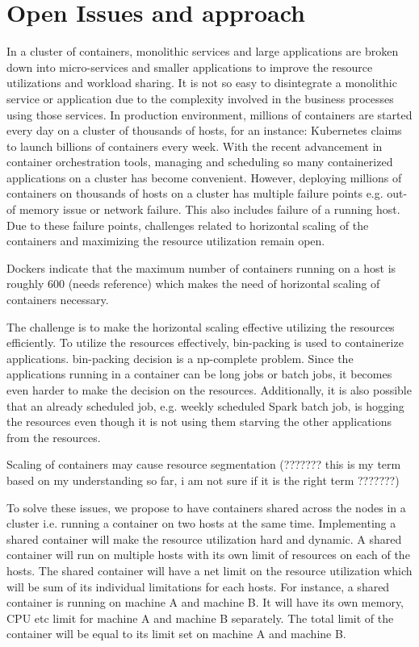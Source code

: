 \section{Open Issues and approach}
\label{sec:OIA}

In a cluster of containers, monolithic services and large applications are broken down into micro-services and smaller applications to improve the resource utilizations and workload sharing.
It is not so easy to disintegrate a monolithic service or application due to the complexity involved in the business processes using those services. In production environment, millions of containers are started every day on a cluster of thousands of hosts, for an instance: Kubernetes claims to launch billions of containers every week. With the recent advancement in container orchestration tools, managing and scheduling so many containerized applications on a cluster has become convenient. However, deploying millions of containers on thousands of hosts on a cluster has multiple failure points e.g. out-of memory issue or network failure. This also includes failure of a running host. Due to these failure points, challenges related to horizontal scaling of the containers and maximizing the resource utilization remain open. 

Dockers indicate that the maximum number of containers running on a host is roughly 600 (needs reference) which makes the need of horizontal scaling of containers necessary. 

The challenge is to make the horizontal scaling effective utilizing the resources efficiently. To utilize the resources effectively, bin-packing is used to containerize applications. bin-packing decision is a np-complete problem. Since the applications running in a container can be long jobs or batch jobs, it becomes even harder to make the decision on the resources. Additionally, it is also possible that an already scheduled job, e.g. weekly scheduled Spark batch job, is hogging the resources even though it is not using them starving the other applications from the resources. 

Scaling of containers may cause resource segmentation (??????? this is my term based on my understanding so far, i am not sure if it is the right term ???????)

To solve these issues, we propose to have containers shared across the nodes in a cluster i.e. running a container on two hosts at the same time. Implementing a shared container will make the resource utilization hard and dynamic. A shared container will run on multiple hosts with its own limit of resources on each of the hosts. The shared container will have a net limit on the resource utilization which will be sum of its individual limitations for each hosts. For instance, a shared container is running on machine A and machine B. It will have its own memory, CPU etc limit for machine A and machine B separately. The total limit of the container will be equal to its limit set on machine A and machine B. 

